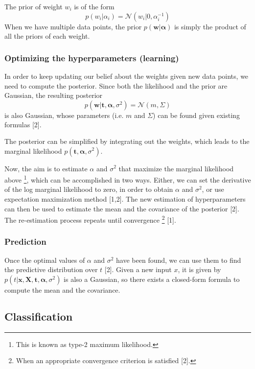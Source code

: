 The prior of weight $w_i$ is of the form
\begin{equation}
p(w_i|\alpha_i)=\mathcal{N}(w_i|0,\alpha_{i}^{-1})
\end{equation}
When we have multiple data points, the prior $p(\boldsymbol{w}|\boldsymbol{\alpha})$ is simply the product of all the priors of each weight.

\subsubsection{Optimizing the hyperparameters (learning)} In order to keep updating our belief about the weights given new data points, we need to compute the posterior. Since both the likelihood and the prior are Gaussian, the resulting posterior
\begin{equation}
p(\boldsymbol{w}|\boldsymbol{t}, \boldsymbol{\alpha}, \sigma^2)=\mathcal{N}(m,\Sigma)
\end{equation}
is also Gaussian, whose parameters (i.e. $m$ and $\Sigma$) can be found given existing formulas [2].

The posterior can be simplified by integrating out the weights, which leads to the marginal likelihood $p(\boldsymbol{t}, \boldsymbol{\alpha}, \sigma^2)$.

Now, the aim is to estimate $\alpha$ and $\sigma^2$ that maximize the marginal likelihood above \footnote{This is known as type-2 maximum likelihood.}, which can be accomplished in two ways. Either, we can set the derivative of the log marginal likelihood to zero, in order to obtain $\alpha$ and $\sigma^2$, or use expectation maximization method [1,2]. The new estimation of hyperparameters can then be used to estimate the mean and the covariance of the posterior [2]. The re-estimation process repeats until convergence \footnote{When an appropriate convergence criterion is satisfied [2]. } [1].

\subsubsection{Prediction}
Once the optimal values of $\alpha$ and $\sigma^2$ have been found, we can use them to find the predictive distribution over $t$ [2]. Given a new input $x$, it is given by $p(t|\boldsymbol{x}, \boldsymbol{X}, \boldsymbol{t}, \boldsymbol{\alpha}, \sigma^2)$ is also a Gaussian, so there exists a closed-form formula to compute the mean and the covariance.

\subsection{Classification}